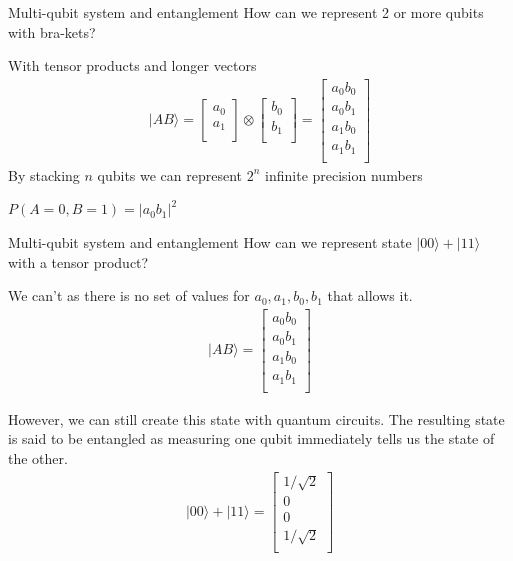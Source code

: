 \begin{frame}{Multi-qubit system and entanglement}
    How can we represent 2 or more qubits with bra-kets? 
    
    With tensor products and longer vectors
    \begin{align*}
	    \lvert AB\rangle
		=
		\begin{bmatrix}
        a_0 \\       
        a_1 \\
        \end{bmatrix}
		\otimes
        \begin{bmatrix}
        b_0 \\       
        b_1 \\
        \end{bmatrix}
        =
        \begin{bmatrix}
        a_0 b_0 \\
        a_0 b_1 \\
        a_1 b_0 \\
        a_1 b_1 \\
        \end{bmatrix}
    \end{align*}
    By stacking $n$ qubits we can represent $2^n$ infinite precision numbers
    
    \centering
    $P(A = 0, B = 1) = \lvert a_0 b_1 \rvert^2 $
\end{frame}


\begin{frame}{Multi-qubit system and entanglement}
    How can we represent state $\lvert 00\rangle + \lvert 11\rangle $ with a tensor product? 
    
    We can't as there is no set of values for $a_0, a_1, b_0, b_1$ that allows it.
    \begin{align*}
	    \lvert AB\rangle
		=
		\begin{bmatrix}
        a_0 b_0 \\
        a_0 b_1 \\
        a_1 b_0 \\
        a_1 b_1 \\
        \end{bmatrix}
    \end{align*}
    
    However, we can still create this state with quantum circuits. The resulting state is said to be entangled as measuring one qubit immediately tells us the state of the other.
    \begin{align*}
	    \lvert 00\rangle + \lvert 11\rangle 
		=
		\begin{bmatrix}
        1/\sqrt{2} \\
        0 \\
        0 \\
        1/\sqrt{2} \\
        \end{bmatrix}
    \end{align*}
\end{frame}